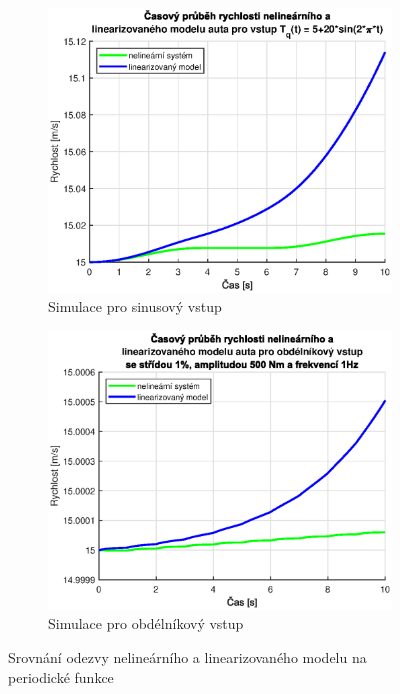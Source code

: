 \documentclass[twoside]{article}
\begin{document}
\begin{figure}[htbp]
    \centering %
\begin{subfigure}{0.45\textwidth}
  \includegraphics[width=\linewidth]{uloha12-sin.eps}
  \caption{Simulace pro sinusový vstup }
\end{subfigure}\hfil %
\begin{subfigure}{0.45\textwidth}
	\includegraphics[width=\linewidth]{uloha12-square.eps}
	\caption{Simulace pro obdélníkový vstup }
\end{subfigure}
\caption{Srovnání odezvy nelineárního a linearizovaného modelu na periodické funkce}
\label{fig:nelin-sin}
\end{figure}
\end{document}
